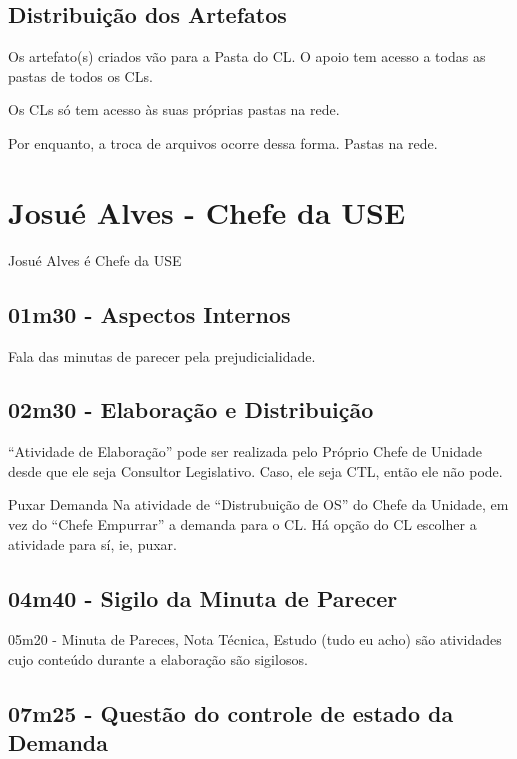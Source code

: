\subsection{Distribuição dos Artefatos}

Os artefato(s) criados vão para a Pasta do CL. O apoio tem acesso a todas as pastas de todos os CLs.

Os CLs só tem acesso às suas próprias pastas na rede.

Por enquanto, a troca de arquivos ocorre dessa forma. Pastas na rede.


\section{Josué Alves - Chefe da USE}

Josué Alves é Chefe da USE

\subsection{01m30 - Aspectos Internos}

Fala das minutas de parecer pela prejudicialidade.

\subsection{02m30 - Elaboração e Distribuição}

``Atividade de Elaboração'' pode ser realizada pelo Próprio Chefe de Unidade desde que ele seja Consultor Legislativo. Caso, ele seja CTL, então ele não pode.

\begin{importante}{Puxar Demanda}
	Na atividade de ``Distrubuição de OS'' do Chefe da Unidade, em vez do ``Chefe Empurrar'' a demanda para o CL. Há opção do CL escolher a atividade para sí, ie, puxar.			
\end{importante}


\subsection{04m40 - Sigilo da Minuta de Parecer}

05m20 - Minuta de Pareces, Nota Técnica, Estudo (tudo eu acho) são atividades cujo conteúdo durante a elaboração são sigilosos.

\subsection{07m25 - Questão do controle de estado da Demanda}

